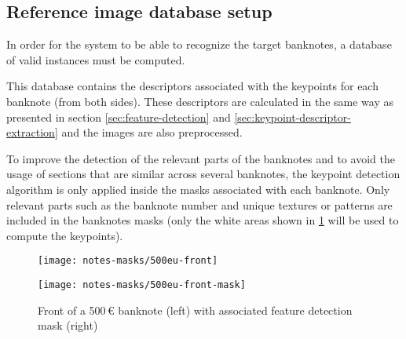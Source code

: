 \subsection{Reference image database setup}

In order for the system to be able to recognize the target banknotes, a database of valid instances must be computed.

This database contains the descriptors associated with the keypoints for each banknote (from both sides). These descriptors are calculated in the same way as presented in section \cref{sec:feature-detection} and \cref{sec:keypoint-descriptor-extraction} and the images are also preprocessed.

To improve the detection of the relevant parts of the banknotes and to avoid the usage of sections that are similar across several banknotes, the keypoint detection algorithm is only applied inside the masks associated with each banknote. Only relevant parts such as the banknote number and unique textures or patterns are included in the banknotes masks (only the white areas shown in \cref{fig:banknote-feature-detection-mask-500-front} will be used to compute the keypoints).


\begin{figure}[H]
	\centering
	\begin{minipage}[h]{.498\textwidth}
		\centering
		\texttt{[image: notes-masks/500eu-front]}
	\end{minipage}\hfill
	\begin{minipage}[h]{.498\textwidth}
		\centering
		\texttt{[image: notes-masks/500eu-front-mask]}
	\end{minipage}
	\caption{Front of a 500\,\euro{} banknote (left) with associated feature detection mask (right)}
	\label{fig:banknote-feature-detection-mask-500-front}
\end{figure}



